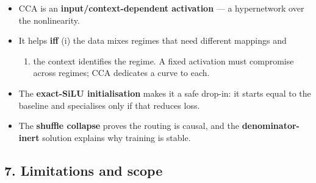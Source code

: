 \documentclass[
  11pt,
]{article}
\providecommand{\tightlist}{%
  \setlength{\itemsep}{0pt}\setlength{\parskip}{0pt}}
\begin{document}
\begin{itemize}
\tightlist
\item
  CCA is an \textbf{input/context-dependent activation} --- a
  hypernetwork over the nonlinearity.
\item
  It helps \textbf{iff} (i) the data mixes regimes that need different
  mappings and

  \begin{enumerate}
  \def\labelenumi{(\roman{enumi})}
  \setcounter{enumi}{1}
  \tightlist
  \item
    the context identifies the regime. A fixed activation must
    compromise across regimes; CCA dedicates a curve to each.
  \end{enumerate}
\item
  The \textbf{exact-SiLU initialisation} makes it a safe drop-in: it
  starts equal to the baseline and specialises only if that reduces
  loss.
\item
  The \textbf{shuffle collapse} proves the routing is causal, and the
  \textbf{denominator-inert} solution explains why training is stable.
\end{itemize}

\subsection{7. Limitations and scope}\label{limitations-and-scope}
\end{document}
